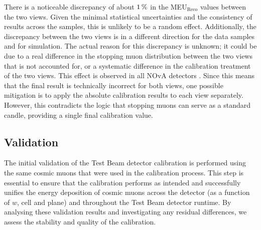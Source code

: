 
There is a noticeable discrepancy of about $\unit[1]{\%}$ in the \gls{MEU}$_{\mathrm{Reco}}$ values between the two views. Given the minimal statistical uncertainties and the consistency of results across the samples, this is unlikely to be a random effect. Additionally, the discrepancy between the two views is in a different direction for the data samples and for simulation. The actual reason for this discrepancy is unknown; it could be due to a real difference in the stopping muon distribution between the two views that is not accounted for, or a systematic difference in the calibration treatment of the two views. This effect is observed in all \gls{NOvA} detectors \cite{NOvA-doc-60709}. Since this means that the final result is technically incorrect for both views, one possible mitigation is to apply the absolute calibration results to each view separately. However, this contradicts the logic that stopping muons can serve as a standard candle, providing a single final calibration value.

\subsection{Validation}\label{sec:TBCalibValidation}

The initial validation of the Test Beam detector calibration is performed using the same cosmic muons that were used in the calibration process. This step is essential to ensure that the calibration performs as intended and successfully unifies the energy deposition of cosmic muons across the detector (as a function of $w$, cell and plane) and throughout the Test Beam detector runtime. By analysing these validation results and investigating any residual differences, we assess the stability and quality of the calibration.

